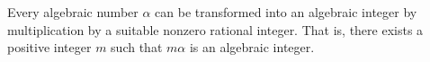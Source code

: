 Every algebraic number $\alpha$ can be transformed into an algebraic integer by multiplication by a suitable nonzero rational integer. That is, there exists a positive integer $m$ such that $m\alpha$ is an algebraic integer.
